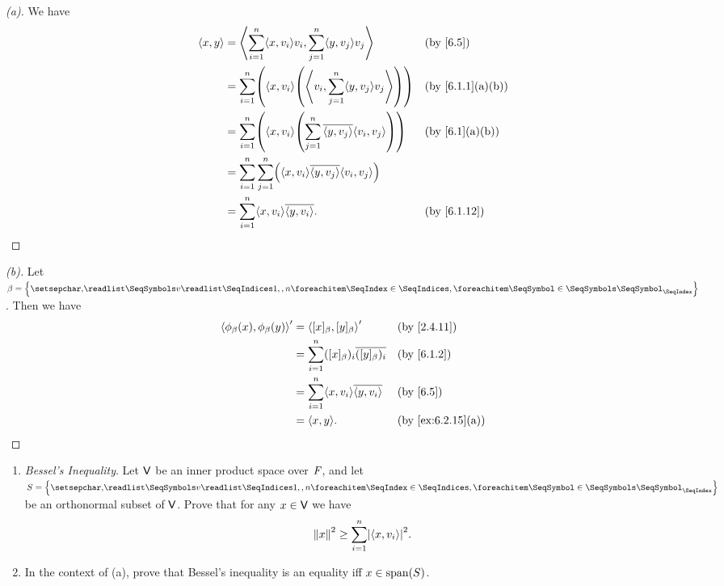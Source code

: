 \begin{proof}[(a)]
  We have
  \begin{align*}
    \inn{x, y} & = \inn{\sum_{i = 1}^n \inn{x, v_i} v_i, \sum_{j = 1}^n \inn{y, v_j} v_j}                  &  & \text{(by \cref{6.5})}         \\
               & = \sum_{i = 1}^n \pa{\inn{x, v_i} \pa{\inn{v_i, \sum_{j = 1}^n \inn{y, v_j} v_j}}}        &  & \text{(by \cref{6.1.1}(a)(b))} \\
               & = \sum_{i = 1}^n \pa{\inn{x, v_i} \pa{\sum_{j = 1}^n \conj{\inn{y, v_j}} \inn{v_i, v_j}}} &  & \text{(by \cref{6.1}(a)(b))}   \\
               & = \sum_{i = 1}^n \sum_{j = 1}^n \pa{\inn{x, v_i} \conj{\inn{y, v_j}} \inn{v_i, v_j}}                                          \\
               & = \sum_{i = 1}^n \inn{x, v_i} \conj{\inn{y, v_i}}.                                        &  & \text{(by \cref{6.1.12})}
  \end{align*}
\end{proof}

\begin{proof}[(b)]
  Let \(\beta = \set{\seq{v}{1,,n}}\).
  Then we have
  \begin{align*}
    \inn{\phi_{\beta}(x), \phi_{\beta}(y)}' & = \inn{[x]_{\beta}, [y]_{\beta}}'                       &  & \text{(by \cref{2.4.11})}       \\
                                            & = \sum_{i = 1}^n ([x]_{\beta})_i \conj{([y]_{\beta})_i} &  & \text{(by \cref{6.1.2})}        \\
                                            & = \sum_{i = 1}^n \inn{x, v_i} \conj{\inn{y, v_i}}       &  & \text{(by \cref{6.5})}          \\
                                            & = \inn{x, y}.                                           &  & \text{(by \cref{ex:6.2.15}(a))}
  \end{align*}
\end{proof}

\begin{ex}\label{ex:6.2.16}
  \begin{enumerate}
    \item \emph{Bessel's Inequality}.
          Let \(\mathsf{V}\) be an inner product space over \(\mathit{F}\), and let \(S = \set{\seq{v}{1,,n}}\) be an orthonormal subset of \(\mathsf{V}\).
          Prove that for any \(x \in \mathsf{V}\) we have
          \[
            \norm{x}^2 \geq \sum_{i = 1}^n \abs{\inn{x, v_i}}^2.
          \]
    \item In the context of (a), prove that Bessel's inequality is an equality iff \(x \in \spn{S}\).
  \end{enumerate}
\end{ex}

